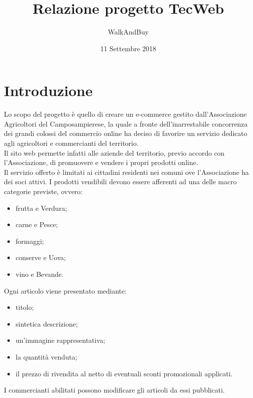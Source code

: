 



\title{\textbf{Relazione progetto TecWeb}}
\author{WalkAndBuy}

\date{11 Settembre 2018}




\makeFrontPage

\tableofcontents

\newpage

\section{Introduzione}

Lo scopo del progetto è quello di creare un e-commerce gestito dall’Associazione Agricoltori del Camposampierese, la quale a fronte dell'inarrestabile concorrenza dei grandi colossi del commercio online ha deciso di favorire un servizio dedicato agli agricoltori e commercianti del territorio.\\
Il sito web permette infatti alle aziende del territorio, previo accordo con l’Associazione, di promuovere e vendere i propri prodotti online. \\
Il servizio offerto è limitati ai cittadini residenti nei comuni ove l’Associazione ha dei soci attivi. 
I prodotti vendibili devono essere afferenti ad una delle macro categorie previste, ovvero:
\begin{itemize}
	\item frutta e Verdura;
	\item carne e Pesce;
	\item formaggi;
	\item conserve e Uova;
	\item vino e Bevande.
\end{itemize}
Ogni articolo viene presentato mediante:
\begin{itemize}
	\item titolo;
	\item sintetica descrizione;
	\item un’immagine rappresentativa;
	\item la quantità venduta;
	\item il prezzo di rivendita al netto di eventuali sconti promozionali applicati.
\end{itemize}
I commercianti abilitati possono modificare gli articoli da essi pubblicati.\\

